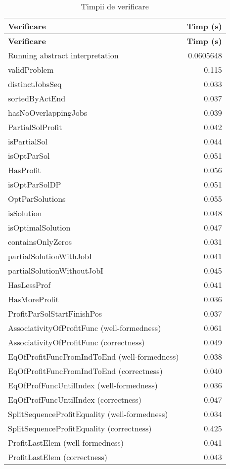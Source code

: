 \begin{longtable}{|l|r|}
\caption{Timpii de verificare}\\
\hline
\textbf{Verificare} & \textbf{Timp (s)} \\
\hline
\endfirsthead
\hline
\textbf{Verificare} & \textbf{Timp (s)} \\
\hline
\endhead
\hline
\endfoot

Running abstract interpretation & 0.0605648 \\
validProblem & 0.115 \\
distinctJobsSeq & 0.033 \\
sortedByActEnd & 0.037 \\
hasNoOverlappingJobs & 0.039 \\
PartialSolProfit & 0.042 \\
isPartialSol & 0.044 \\
isOptParSol & 0.051 \\
HasProfit & 0.056 \\
isOptParSolDP & 0.051 \\
OptParSolutions & 0.055 \\
isSolution & 0.048 \\
isOptimalSolution & 0.047 \\
containsOnlyZeros & 0.031 \\
partialSolutionWithJobI & 0.041 \\
partialSolutionWithoutJobI & 0.045 \\
HasLessProf & 0.041 \\
HasMoreProfit & 0.036 \\
ProfitParSolStartFinishPos & 0.037 \\
AssociativityOfProfitFunc (well-formedness) & 0.061 \\
AssociativityOfProfitFunc (correctness) & 0.049 \\
EqOfProfitFuncFromIndToEnd (well-formedness) & 0.038 \\
EqOfProfitFuncFromIndToEnd (correctness) & 0.040 \\
EqOfProfFuncUntilIndex (well-formedness) & 0.036 \\
EqOfProfFuncUntilIndex (correctness) & 0.047 \\
SplitSequenceProfitEquality (well-formedness) & 0.034 \\
SplitSequenceProfitEquality (correctness) & 0.425 \\
ProfitLastElem (well-formedness) & 0.041 \\
ProfitLastElem (correctness) & 0.043 \\

\end{longtable}
